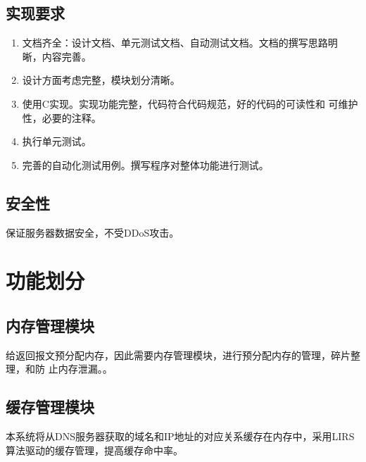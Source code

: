 \documentclass[12pt, a4paper, titlepage]{article}
\begin{document}
\subsection{实现要求}
\begin{enumerate}
	\item{ 文档齐全：设计文档、单元测试文档、自动测试文档。文档的撰写思路明
	晰，内容完善。}
	\item{设计方面考虑完整，模块划分清晰。}
	\item{使用C实现。实现功能完整，代码符合代码规范，好的代码的可读性和
	可维护性，必要的注释。}
	\item{ 执行单元测试。}
	\item{ 完善的自动化测试用例。撰写程序对整体功能进行测试。}
\end{enumerate}
\subsection{安全性}
	保证服务器数据安全，不受DDoS攻击。
\section{功能划分}


\subsection{内存管理模块}
给返回报文预分配内存，因此需要内存管理模块，进行预分配内存的管理，碎片整理，和防
止内存泄漏。。
\subsection{缓存管理模块}
本系统将从DNS服务器获取的域名和IP地址的对应关系缓存在内存中，采用LIRS算法驱动的缓存管理，提高缓存命中率。
\end{document}
